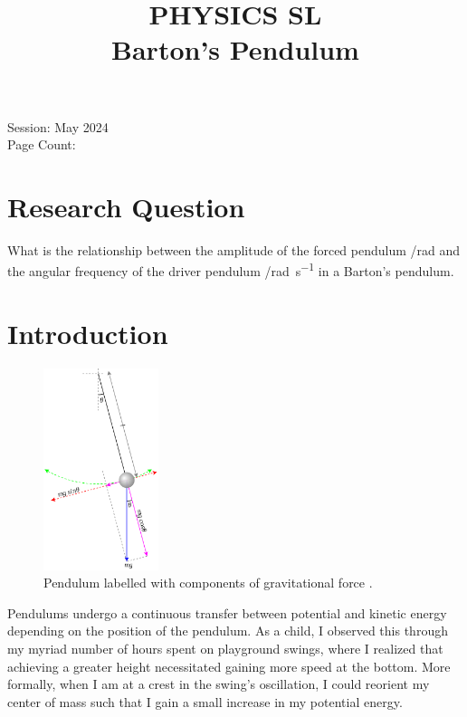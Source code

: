 \documentclass[letterpaper, 12pt]{article}
\title{PHYSICS SL
\\
Barton's Pendulum}
\author{}
\date{}
\begin{document}
\nocite{*}

\maketitle
\begin{center}
    Session: May 2024
    \\
    Page Count:
\end{center}
\newpage

\tableofcontents
\newpage

\setcounter{page}{1}

\section{Research Question}

What is the relationship between the amplitude of
the forced pendulum /\unit{rad} and the
angular frequency of the driver pendulum /\unit{rad.s^{-1}} in a Barton's pendulum.

\section{Introduction}

\begin{figure}
    \centering
    \includegraphics[width=0.3\textwidth]{labelledPendulum.png}
    \caption{Pendulum labelled with components of gravitational force \protect\cite{krishnavedalaEnglishDiagramDepicting2013}.}
    \label{fig:labelledPendulum}
\end{figure}

Pendulums undergo a continuous transfer
between potential and kinetic energy depending
on the position of the pendulum. As a child, I
observed this through my myriad number of hours
spent on playground swings, where I realized
that achieving a greater height necessitated
gaining more speed at the bottom. More formally,
when I am at a crest in the swing's oscillation,
I could reorient my center of mass such that
I gain a small increase in my
potential energy.
\end{document}

